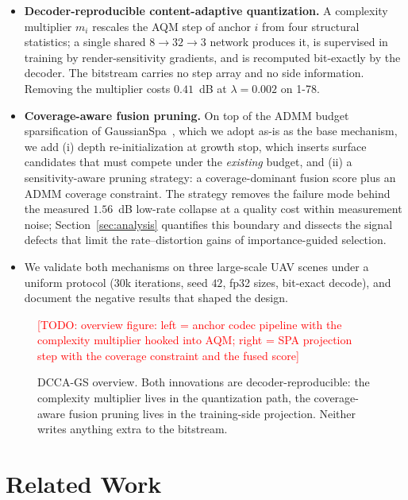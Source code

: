 \documentclass[conference]{IEEEtran}
\newcommand{\DCCA}{DCCA-GS}
\newcommand{\todo}[1]{\textcolor{red}{[TODO: #1]}}
\begin{document}
\begin{itemize}
\item \textbf{Decoder-reproducible content-adaptive quantization.} A complexity
multiplier $m_i$ rescales the AQM step of anchor $i$ from four structural
statistics; a single shared $8{\to}32{\to}3$ network produces it, is supervised in
training by render-sensitivity gradients, and is recomputed bit-exactly by the
decoder. The bitstream carries no step array and no side information. Removing the
multiplier costs $0.41$~dB at $\lambda{=}0.002$ on 1-78.
\item \textbf{Coverage-aware fusion pruning.} On top of the ADMM budget
sparsification of GaussianSpa~\cite{zhang2025gaussianspa}, which we adopt as-is as
the base mechanism, we add (i) depth re-initialization at growth stop, which inserts
surface candidates that must compete under the \emph{existing} budget, and (ii) a
sensitivity-aware pruning strategy: a coverage-dominant fusion score plus an ADMM
coverage constraint. The strategy removes the failure mode behind the measured
$1.56$~dB low-rate collapse at a quality cost within measurement noise;
Section~\ref{sec:analysis} quantifies this boundary and dissects the signal
defects that limit the rate--distortion gains of importance-guided selection.
\item We validate both mechanisms on three large-scale UAV scenes under a uniform
protocol ($30$k iterations, seed $42$, fp32 sizes, bit-exact decode), and document
the negative results that shaped the design.
\end{itemize}

\begin{figure}[t]
\centering
\todo{overview figure: left = anchor codec pipeline with the complexity multiplier
hooked into AQM; right = SPA projection step with the coverage constraint and the
fused score}
\caption{\DCCA{} overview. Both innovations are decoder-reproducible: the
complexity multiplier lives in the quantization path, the coverage-aware fusion
pruning lives in the training-side projection. Neither writes anything extra to the
bitstream.}
\label{fig:overview}
\end{figure}

\section{Related Work}
\end{document}
